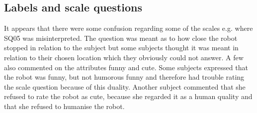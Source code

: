 \subsection{Labels and scale questions}
%
It appears that there were some confusion regarding some of the scales e.g. where SQ05 was misinterpreted. The question was meant as to how close the robot stopped in relation to the subject but some subjects thought it was meant in relation to their chosen location which they obviously could not answer. A few also commented on the attributes funny and cute. Some subjects expressed that the robot was funny, but not humorous funny and therefore had trouble rating the scale question because of this duality. Another subject commented that she refused to rate the robot as cute, because she regarded it as a human quality and that she refused to humanise the robot.